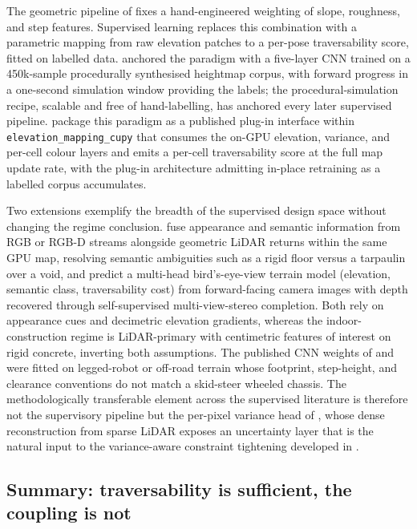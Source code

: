 \documentclass[11pt,a4paper]{article}
\begin{document}
The geometric pipeline of  fixes a hand-engineered weighting of slope, roughness, and step features. Supervised learning replaces this combination with a parametric mapping from raw elevation patches to a per-pose traversability score, fitted on labelled data. \citet{chavez-garciaImageClassificationGround2017} anchored the paradigm with a five-layer CNN trained on a 450k-sample procedurally synthesised heightmap corpus, with forward progress in a one-second simulation window providing the labels; the procedural-simulation recipe, scalable and free of hand-labelling, has anchored every later supervised pipeline. \citet{mikiElevationMappingLocomotion2022} package this paradigm as a published plug-in interface within \texttt{elevation\_mapping\_cupy} that consumes the on-GPU elevation, variance, and per-cell colour layers and emits a per-cell traversability score at the full map update rate, with the plug-in architecture admitting in-place retraining as a labelled corpus accumulates.

Two extensions exemplify the breadth of the supervised design space without changing the regime conclusion. \citet{erniMEMMultiModalElevation2023} fuse appearance and semantic information from RGB or RGB-D streams alongside geometric LiDAR returns within the same GPU map, resolving semantic ambiguities such as a rigid floor versus a tarpaulin over a void, and \citet{mengTerrainNetVisualModeling2023} predict a multi-head bird's-eye-view terrain model (elevation, semantic class, traversability cost) from forward-facing camera images with depth recovered through self-supervised multi-view-stereo completion. Both rely on appearance cues and decimetric elevation gradients, whereas the indoor-construction regime is LiDAR-primary with centimetric features of interest on rigid concrete, inverting both assumptions. The published CNN weights of \citet{chavez-garciaImageClassificationGround2017} and \citet{mikiElevationMappingLocomotion2022} were fitted on legged-robot or off-road terrain whose footprint, step-height, and clearance conventions do not match a skid-steer wheeled chassis. The methodologically transferable element across the supervised literature is therefore not the supervisory pipeline but the per-pixel variance head of \citet{yangRealtimeNeuralDense2023}, whose dense reconstruction from sparse LiDAR exposes an uncertainty layer that is the natural input to the variance-aware constraint tightening developed in .

\subsection{Summary: traversability is sufficient, the coupling is not}
\label{sec:sq2:summary}
\end{document}
